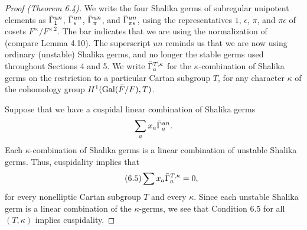 \documentclass{amsart}
\begin{document}
\begin{proof}[Proof (Theorem 6.4)]  We write the four Shalika germs of subregular
unipotent elements as $\bar\Gamma^{un}_1$, $\bar\Gamma^{un}_\epsilon$, $\bar\Gamma^{un}_\pi$,
and $\bar\Gamma^{un}_{\pi\epsilon}$, using the representatives $1$, $\epsilon$,
$\pi$, and $\pi\epsilon$ of cosets $F^\times/F^{\times\,2}$.  The
bar indicates that we are using the normalization of \cite{H5}
(compare Lemma 4.10).
The superscript $un$ reminds us that we are now using ordinary
(unstable) Shalika germs, and no longer the stable germs used throughout
Sections 4 and 5.  We write $\bar\Gamma^{T,\kappa}_a$ for the $\kappa$-combination
of Shalika germs on the restriction to a particular Cartan subgroup $T$,
for any character $\kappa$ of the cohomology group
$H^1(\operatorname{Gal}({\bar F}/F),T)$.

Suppose that we have a cuspidal linear combination of Shalika germs
$$\sum_a x_a \bar\Gamma^{un}_a.$$
Each $\kappa$-combination of Shalika germs is a linear combination
of unstable Shalika germs.  Thus, cuspidality implies that
\begin{equation}\tag {6.5}
\sum x_a \bar\Gamma^{T,\kappa}_a = 0,
\end{equation}
for every nonelliptic Cartan subgroup $T$ and every $\kappa$.
Since each unstable
Shalika germ is a linear combination of the $\kappa$-germs, we see
that Condition 6.5 for all $(T,\kappa)$ implies cuspidality.


\end{proof}
\end{document}
